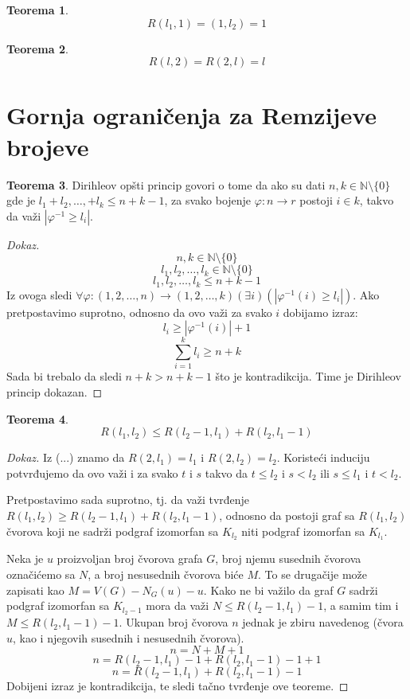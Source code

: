 \documentclass{article}
\theoremstyle{definition}
\newtheorem{teorema}{Teorema}[section]
\newcommand{\dokaz}[1]{\begin{proof}[Dokaz]#1\end{proof}}
\begin{document}
	
	
	
	
	
	\begin{teorema}
		\[
		R(l_1,1)= (1,l_2) = 1
		\]
	\end{teorema}
	\begin{teorema}
		\[
		R(l,2)=R(2,l)=l
		\]
	\end{teorema}
	
	\newpage
	\section{Gornja ograničenja za Remzijeve brojeve}
	
	\begin{teorema}
		Dirihleov opšti princip govori o tome da ako su dati $n,k \in \mathbb{N} \setminus \{0\}$ gde je $l_1+ l_2, \ldots , + l_k \leq n+k-1$, za svako bojenje $\varphi : n \rightarrow r$ postoji $i \in k$, takvo da važi $|\varphi^{-1} \geq l_i|$.
	\end{teorema}
	\dokaz{
		\[
		n,k \in \mathbb{N} \setminus \{0\}
		\]
		\[
		l_1, l_2,\ldots , l_k \in \mathbb{N} \setminus \{0\}
		\]
		\[
		l_1, l_2, \ldots , l_k \leq n+k-1
		\]
		Iz ovoga sledi $ \forall \varphi : (1,2,\ldots,n) \rightarrow (1,2,\ldots, k)(\exists i)(| \varphi^{-1}(i) \geq l_i|) $. Ako pretpostavimo suprotno, odnosno da ovo važi za svako $i$ dobijamo izraz:
		\[
		l_i \geq |\varphi^{-1}(i)|+1
		\]
		\[
		\sum\limits_{i=1}^{k} l_i \geq n+k
		\]
		Sada bi trebalo da sledi $n+k > n+k-1$ što je kontradikcija. Time je Dirihleov princip dokazan.
	}
	
	
	
	\begin{teorema}
		\[
		R(l_1,l_2) \leq R(l_2-1, l_1) + R(l_2, l_1-1)
		\]
	\end{teorema}
	\dokaz{
		Iz (...) znamo da $R(2,l_1)=l_1$ i $R(2,l_2)=l_2$. Koristeći induciju potvrđujemo da ovo važi i za svako $t$ i $s$ takvo da $t\leq l_2$ i $s<l_2$ ili $s\leq l_1$ i $t<l_2$.
		
		Pretpostavimo sada suprotno, tj. da važi tvrđenje $R(l_1,l_2) \geq R(l_2-1, l_1) + R(l_2, l_1-1)$, odnosno da postoji graf sa $R(l_1,l_2)$ čvorova koji ne sadrži podgraf izomorfan sa $K_{l_2}$ niti podgraf izomorfan sa $K_{l_1}$.
		
		
		Neka je $u$ proizvoljan broj čvorova grafa $G$, broj njemu susednih čvorova označićemo sa $N$, a broj nesusednih čvorova biće $M$.
		To se drugačije može zapisati kao $M=V(G)-N_G(u)-{u}$.
		Kako ne bi važilo da graf $G$ sadrži podgraf izomorfan sa $K_{l_2-1}$  mora da važi $N\leq R(l_2-1, l_1)-1 $, a samim tim i $M \leq R(l_2, l_1-1)-1 $. 
		Ukupan broj čvorova $n$ jednak je zbiru navedenog (čvora $u$, kao i njegovih susednih i nesusednih čvorova).
		\[
		n= N+M+1
		\]
		\[
		n= R(l_2-1, l_1)-1 + R(l_2, l_1-1)-1+1
		\]
		\[
		n= R(l_2-1, l_1)+ R(l_2, l_1-1)-1
		\]
		Dobijeni izraz je kontradikcija, te sledi tačno tvrđenje ove teoreme.
	}
	
\end{document}
